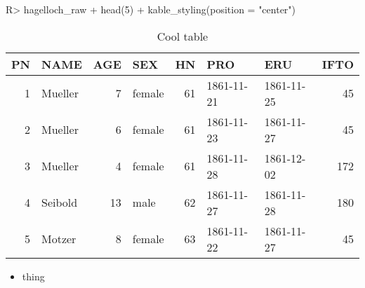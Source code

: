 \documentclass[
]{jss}
\begin{document}
\begin{CodeChunk}
\begin{CodeInput}
R> hagelloch_raw %
+   head(5) %
+   kable_styling(position = "center")
\end{CodeInput}
\begin{table}

\caption{\label{tab:hagelloch-subset-view}Cool table}
\centering
\begin{tabular}[t]{rlrlrllr}
\toprule
PN & NAME & AGE & SEX & HN & PRO & ERU & IFTO\\
\midrule
1 & Mueller & 7 & female & 61 & 1861-11-21 & 1861-11-25 & 45\\
2 & Mueller & 6 & female & 61 & 1861-11-23 & 1861-11-27 & 45\\
3 & Mueller & 4 & female & 61 & 1861-11-28 & 1861-12-02 & 172\\
4 & Seibold & 13 & male & 62 & 1861-11-27 & 1861-11-28 & 180\\
5 & Motzer & 8 & female & 63 & 1861-11-22 & 1861-11-27 & 45\\
\bottomrule
\end{tabular}
\end{table}

\end{CodeChunk}

\begin{itemize}
\item thing
\end{itemize}


\end{document}

